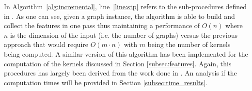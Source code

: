 In Algorithm~\ref{alg:incremental}, line~\ref{line:stp} refers to the sub-procedures
defined in \cite{nnavarin, rtesselli}.
As one can see, given a graph instance, the algorithm is able to build and
collect the features in one pass thus maintaining a performance of $O(n)$ where
$n$ is the dimension of the input (i.e. the number of graphs) versus the
previous approach that would require $O(m \cdot n)$ with $m$ being the number of
kernels being computed.
A similar version of this algorithm has been implemented for the computation
of the kernels discussed in Section \ref{subsec:features}.
Again, this procedures has largely been derived from the work done in \cite{nnavarin, rtesselli}.
An analysis if the computation times will be provided in Section \ref{subsec:time_results}.


